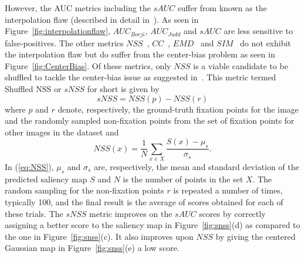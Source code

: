 \documentclass[12pt,onecolumn,journal,	draftclsnofoot]{IEEEtran}
\begin{document}
However, the AUC metrics including the $sAUC$ suffer from   known as the interpolation flaw (described in detail in~\cite{margolin2014evaluate}). As seen in Figure~\ref{fig:interpolationflaw}, $AUC_{Borji}$, $AUC_{Judd}$ and $sAUC$ are less sensitive to false-positives.    
The other metrics $NSS$~\cite{NSS}, $CC$~\cite{borjieval}, $EMD$~\cite{mit-saliency-benchmark} and $SIM$~\cite{mit-saliency-benchmark} do not exhibit the interpolation flaw but do suffer from the center-bias problem as seen in Figure~\ref{fig:CenterBias}. %
Of these metrics, only $NSS$ is a viable candidate to be shuffled to tackle the center-bias issue as suggested in~\cite{MilindSamTPAMI}.  This metric termed Shuffled NSS or $sNSS$ for short is given by
\begin{equation}
sNSS = NSS(p) - NSS(r)
\label{eq:SNSS}
\end{equation}
\noindent where $p$ and $r$ denote, respectively, the ground-truth fixation points for the image and the randomly sampled non-fixation points from the set of fixation points for other images in the dataset and
\begin{equation}
NSS(x) = \frac{1}{N}\sum\limits_{x\in X}\frac{S(x) - \mu_s}{\sigma_s}.
\label{eq:NSS}
\end{equation}
In (\ref{eq:NSS}), $\mu_s$ and $\sigma_s$ are, respectively, the mean and standard deviation of the predicted saliency map $S$ and $N$ is the number of points in the set $X$. The random sampling for the non-fixation points $r$ is repeated a number of times, typically 100, and the final result is the average of scores obtained for each of these trials. The $sNSS$ metric improves on the $sAUC$ scores by correctly assigning a better score to the saliency map in Figure~\ref{fig:snss}(d) as compared to the one in Figure~\ref{fig:snss}(c). It also improves upon $NSS$ by giving the centered Gaussian map in Figure~\ref{fig:snss}(e) a low score. 
\end{document}
